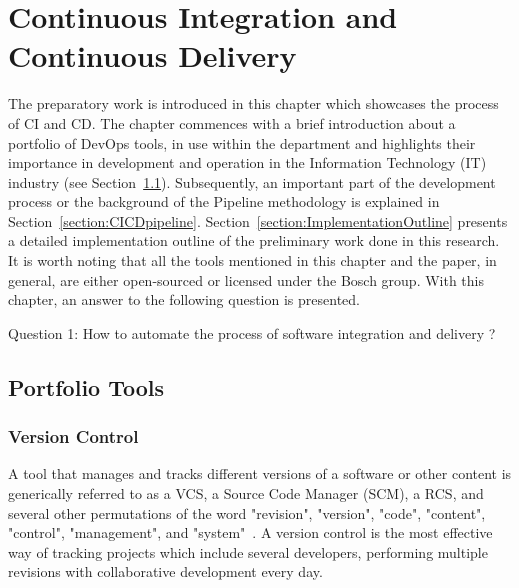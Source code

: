 
\chapter{Continuous Integration and Continuous Delivery} %

\label{Chapter3} %

The preparatory work is introduced in this chapter which showcases the process of CI and CD. The chapter commences with a brief introduction about a portfolio of DevOps tools, in use within the department and highlights their importance in development and operation in the Information Technology (IT) industry (see Section~\ref{section:Integrationtools}). Subsequently, an important part of the development process or the background of the Pipeline methodology is explained in Section~\ref{section:CICDpipeline}. Section~\ref{section:ImplementationOutline} presents a detailed implementation outline of the preliminary work done in this research. It is worth noting that all the tools mentioned in this chapter and the paper, in general, are either open-sourced or licensed under the Bosch group. With this chapter, an answer to the following question is presented.

\vspace{0.2cm}
\noindent Question 1: How to automate the process of software integration and delivery ?


\section{Portfolio Tools} \label{section:Integrationtools}

\subsection{Version Control} \label{section:versioncontrol}

A tool that manages and tracks different versions of a software or other content is generically referred to as a \ac{VCS}, a Source Code Manager (SCM), a \ac{RCS}, and several other permutations of the word "revision", "version", "code", "content", "control", "management", and "system"~\parencite{loeliger2012version}. A version control is the most effective way of tracking projects which include several developers, performing multiple revisions with collaborative development every day. 

